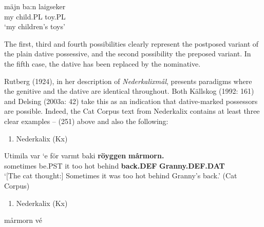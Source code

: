 \ea\label{}
\gll mäjn  ba:n  laigseker\\


my  child.PL  toy.PL\\ %


‘my children’s toys’
\z


The first, third and fourth possibilities clearly represent the postposed variant of the plain dative possessive, and the second possibility the preposed variant. In the fifth case, the dative has been replaced by the nominative.  

Rutberg (1924), in her description of \textit{Nederkalixmål}, presents paradigms where the genitive and the dative are identical throughout. Both Källskog (1992: 161) and Delsing (2003a: 42) take this as an indication that dative-marked possessors are possible. Indeed, the Cat Corpus text from Nederkalix contains at least three clear examples – (251) above and also the following:

\begin{enumerate} %
\item 
Nederkalix (Kx)

\end{enumerate} %
\ea\label{}
\gll Utimila  var  ‘e  för  varmt  baki  \textbf{röyggen} \textbf{mårmorn.}\\


sometimes  be.PST  it  too  hot  behind  \textbf{back.DEF} \textbf{Granny.DEF.DAT}\\ %


‘[The cat thought:] Sometimes it was too hot behind Granny’s back.’ (Cat Corpus)
\z


\begin{enumerate} %
\item 
Nederkalix (Kx)

\end{enumerate} %
\ea\label{}
\gll mårmorn  vé\\


